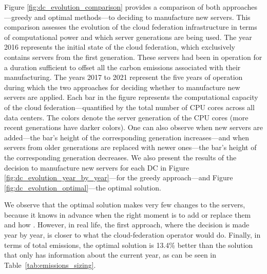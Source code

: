 Figure \ref{fig:dc_evolution_comparison} provides a comparison of both approaches---greedy and optimal methods---to deciding to manufacture new servers.   This comparison assesses the evolution of the cloud federation infrastructure in terms of computational power and which server generations are being used. The year 2016 represents the initial state of the cloud federation, which exclusively contains servers from the first generation. These servers had been in operation for a duration sufficient to offset all the carbon emissions associated with their manufacturing. The years 2017 to 2021 represent the five years of operation during which the two approaches for deciding whether to manufacture new servers are applied. Each bar in the figure represents the computational capacity of the cloud federation---quantified by the total number of CPU cores across all data centers. The colors denote the server generation of the CPU cores  (more recent generations have darker colors). One can also observe when new servers are added---the bar's height of the corresponding generation increases---and when servers from older generations are replaced with newer ones---the bar's height of the corresponding generation decreases. We also present the results of the decision to manufacture new servers for each DC in Figure \ref{fig:dc_evolution_year_by_year}---for the greedy approach---and Figure \ref{fig:dc_evolution_optimal}---the optimal solution.

We observe that the optimal solution makes very few changes to the servers, because it knows in advance when the right moment is to add or replace them and how . However, in real life, the first approach, where the decision is made year by year, is closer to what the cloud-federation operator would do. Finally, in terms of total  emissions, the optimal solution is 13.4\% better than the solution that only has information about the current year, as can be seen in Table~\ref{tab:emissions_sizing}.

